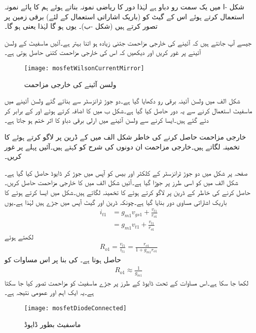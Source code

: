 شکل -ا  میں    یک سمت رو دباو ہے لہٰذا دور کا ریاضی نمونہ بناتے ہوئے ہم  کا پائے نمونہ استعمال کرتے ہوئے اس کے گیٹ کو (باریک اشاراتی استعمال کے لئے) برقی زمین پر تصور کرتے ہیں (شکل -ب)۔ یوں  ہو گا لہٰذا  یعنی     ہو گا۔

جیسے آپ جانتے ہیں کہ آئینے کی خارجی مزاحمت جتنی زیادہ ہو اتنا بہتر ہے۔آئیں ماسفیٹ کے ولسن آئینے پر غور کریں اور دیکھیں کہ اس کی خارجی مزاحمت کتنی حاصل ہوتی ہے۔
\begin{figure}
\centering
\texttt{[image: mosfetWilsonCurrentMirror]}
\caption{ولسن آئینے کی خارجی مزاحمت}
\label{شکل_تفرقی_ماسفیٹ_ولسن_آئینے_کی_خارجی_مزاحمت}
\end{figure}

شکل  الف میں ولسن آئینہ برقی رو دکھایا گیا ہے۔دو جوڑ ٹرانزسٹر سے بنائے گئے ولسن آئینے میں ماسفیٹ استعمال کرنے سے یہ دور حاصل کیا گیا ہے۔شکل  ب میں  کا اضافہ کرتے ہوئے  اور  کے  برابر کر دئے گئے ہیں۔ایسا کرنے سے ولسن آئینے میں ارلی برقی دباو کا اثر ختم ہو جاتا ہے۔

خارجی مزاحمت حاصل کرنے کی خاطر شکل  الف میں  کے ڈرین پر  لاگو کرتے ہوئے  کا تخمینہ لگاتے ہیں۔خارجی مزاحمت  ان دونوں کی شرح کو کہتے ہیں۔آئیں پہلے  پر غور کریں۔

صفحہ  پر شکل  میں دو جوڑ ٹرانزسٹر کے کلکٹر اور بیس کو آپس میں جوڑ کر ڈایوڈ حاصل کیا گیا ہے۔شکل  الف میں  کو اسی طرز پر جوڑا گیا ہے۔آئیں شکل  الف میں  کا خارجی مزاحمت  حاصل کریں۔ حاصل کرنے کی خاطر  کے ڈرین پر  لاگو کرتے ہوئے  کا تخمینہ لگاتے ہیں۔شکل  میں ایسا کرتے ہوئے    کا باریک اشاراتی مساوی دور بنایا گیا ہے۔چونکہ ڈرین اور گیٹ آپس میں جڑے ہیں لہٰذا   ہے۔یوں
\begin{align*}
i_{t1}&=g_{m1} v_{gs1}+\frac{v_{t1}}{r_{o1}}\\
&=g_{m1} v_{t1}+\frac{v_{t1}}{r_{o1}}
\end{align*}
لکھتے ہوئے
\begin{align}
R_{o1}=\frac{v_{t1}}{i_{t1}}=\frac{r_{o1}}{1+g_{m1} r_{o1}}
\end{align}
حاصل ہوتا ہے۔ کی بنا پر اس مساوات کو
\begin{align}
R_{o1} \approx \frac{1}{g_{m1}}
\end{align}
لکھا جا سکا ہے۔اس مساوات کے تحت ڈایوڈ کے طرز پر جڑے ماسفیٹ کو مزاحمت  تصور کیا جا سکتا ہے۔یہ ایک اہم اور عمومی نتیجہ ہے۔ 
\begin{figure}
\centering
\texttt{[image: mosfetDiodeConnected]}
\caption{ماسفیٹ بطور ڈایوڈ}
\label{شکل_تفرقی_ماسفیٹ_بطور_ڈایوڈ}
\end{figure}

